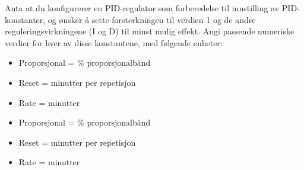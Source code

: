 
Anta at du konfigurerer en PID-regulator som forberedelse til innstilling av PID-konstanter, og ønsker å sette forsterkningen til verdien 1 og de andre reguleringsvirkningene (I og D) til minst mulig effekt. Angi passende numeriske verdier for hver av disse konstantene, med følgende enheter:

\begin{itemize}
\item{} Proporsjonal = \underbar{\hskip 50pt} \% proporsjonalbånd
\vskip 5pt
\item{} Reset = \underbar{\hskip 50pt} minutter per repetisjon
\vskip 5pt
\item{} Rate = \underbar{\hskip 50pt} minutter
\end{itemize}







\begin{itemize}
\item{} Proporsjonal =  \% proporsjonalbånd
\item{} Reset =  minutter per repetisjon
\item{} Rate =  minutter
\end{itemize}








